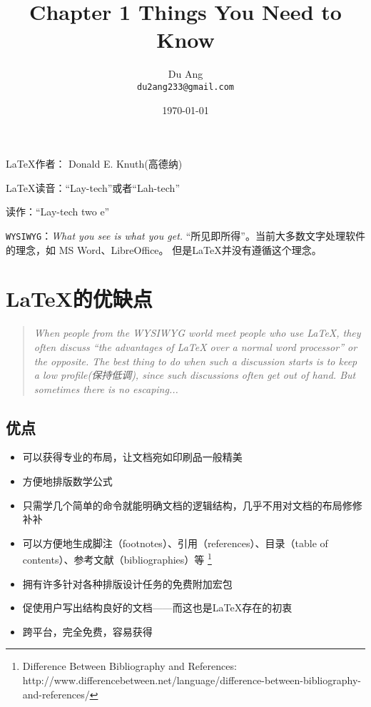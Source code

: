 \documentclass[UTF8]{ctexart}
\title{\heiti Chapter 1 Things You Need to Know}
\author{\kaishu Du Ang \\ \texttt{du2ang233@gmail.com} }
\date{\today}
\begin{document}
\maketitle

\LaTeX 作者： Donald E. Knuth(高德纳)

\LaTeX 读音：“Lay-tech”或者“Lah-tech”

\LaTeXe 读作：“Lay-tech two e”

\texttt{WYSIWYG}：{\itshape What you see is what you get.} “所见即所得”。当前大多数文字处理软件的理念，如 MS Word、LibreOffice。
但是\LaTeX 并没有遵循这个理念。

\section{\LaTeX 的优缺点}
\begin{quotation}
    \itshape When people from the WYSIWYG world meet people who use \LaTeX, they
    often discuss “the advantages of \LaTeX{} over a normal word processor” or the
    opposite. The best thing to do when such a discussion starts is to keep a low
    profile(保持低调), since such discussions often get out of hand. But sometimes there is
    no escaping...
\end{quotation}
\subsection{优点}
\begin{itemize}
    \item 可以获得专业的布局，让文档宛如印刷品一般精美
    \item 方便地排版数学公式
    \item 只需学几个简单的命令就能明确文档的逻辑结构，几乎不用对文档的布局修修补补
    \item 可以方便地生成脚注（footnotes）、引用（references）、目录（table of contents）、参考文献（bibliographies）等
            \footnote{Difference Between Bibliography and References:
            http://www.differencebetween.net/language/difference-between-bibliography-and-references/}
    \item 拥有许多针对各种排版设计任务的免费附加宏包
    \item 促使用户写出结构良好的文档——而这也是LaTeX存在的初衷
    \item 跨平台，完全免费，容易获得
\end{itemize}
\end{document}

